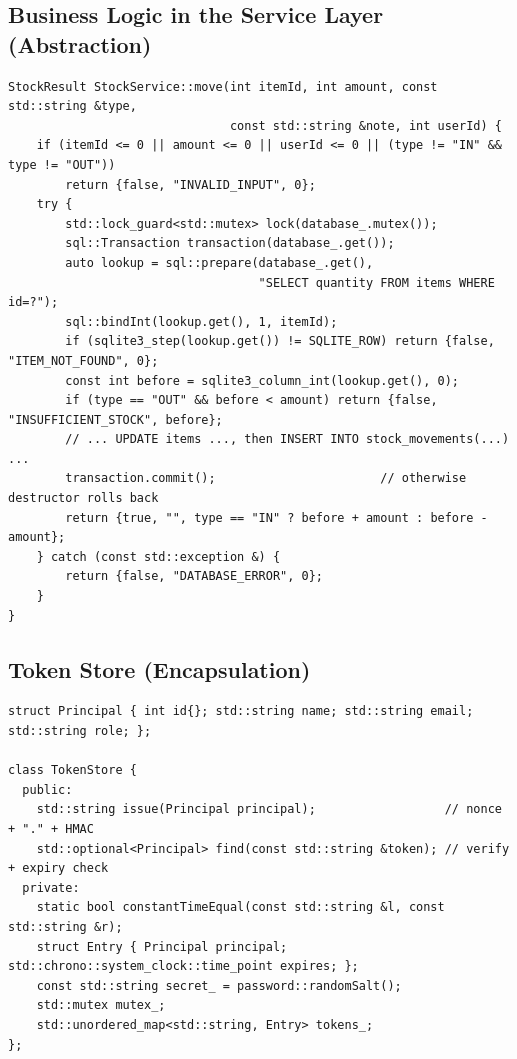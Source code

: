 \documentclass[12pt,a4paper,oneside]{book}
\begin{document}
\subsection{Business Logic in the Service Layer (Abstraction)}
\begin{lstlisting}[caption={\texttt{StockService::move()} (abridged): atomic stock update and movement log}, label={lst:move}]
StockResult StockService::move(int itemId, int amount, const std::string &type,
                               const std::string &note, int userId) {
    if (itemId <= 0 || amount <= 0 || userId <= 0 || (type != "IN" && type != "OUT"))
        return {false, "INVALID_INPUT", 0};
    try {
        std::lock_guard<std::mutex> lock(database_.mutex());
        sql::Transaction transaction(database_.get());
        auto lookup = sql::prepare(database_.get(),
                                   "SELECT quantity FROM items WHERE id=?");
        sql::bindInt(lookup.get(), 1, itemId);
        if (sqlite3_step(lookup.get()) != SQLITE_ROW) return {false, "ITEM_NOT_FOUND", 0};
        const int before = sqlite3_column_int(lookup.get(), 0);
        if (type == "OUT" && before < amount) return {false, "INSUFFICIENT_STOCK", before};
        // ... UPDATE items ..., then INSERT INTO stock_movements(...) ...
        transaction.commit();                       // otherwise destructor rolls back
        return {true, "", type == "IN" ? before + amount : before - amount};
    } catch (const std::exception &) {
        return {false, "DATABASE_ERROR", 0};
    }
}
\end{lstlisting}

\subsection{Token Store (Encapsulation)}
\begin{lstlisting}[caption={\texttt{TokenStore}: private state behind a two-method interface (abridged)}, label={lst:token}]
struct Principal { int id{}; std::string name; std::string email; std::string role; };

class TokenStore {
  public:
    std::string issue(Principal principal);                  // nonce + "." + HMAC
    std::optional<Principal> find(const std::string &token); // verify + expiry check
  private:
    static bool constantTimeEqual(const std::string &l, const std::string &r);
    struct Entry { Principal principal; std::chrono::system_clock::time_point expires; };
    const std::string secret_ = password::randomSalt();
    std::mutex mutex_;
    std::unordered_map<std::string, Entry> tokens_;
};
\end{lstlisting}
\end{document}
